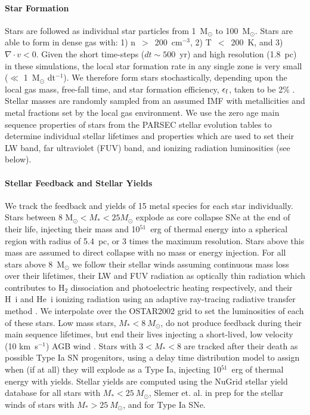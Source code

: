 \paragraph{Star Formation} Stars are followed as individual star particles from 1~M$_{\odot}$ to 100~M$_{\odot}$. Stars are able to form in dense gas with: 1) n~$>$~200~cm$^{-3}$, 2) T~$<$~200~K, and 3) $\nabla \cdot v < 0$. Given the short time-steps ($dt \sim 500$~yr) and high resolution (1.8~pc) in these simulations, the local star formation rate in any single zone is very small ($\ll$ 1~M$_{\odot}$ dt$^{-1}$). We therefore form stars stochastically, depending upon the local gas mass, free-fall time, and star formation efficiency, $\epsilon_{\rm f}$, taken to be 2\% \citep{KrumholzMcKee2005}. Stellar masses are randomly sampled from an assumed \cite{Salpeter1955} IMF with metallicities and metal fractions set by the local gas environment. We use the zero age main sequence properties of stars from the \textsc{PARSEC} stellar evolution tables \citep{Bressan2012,Tang2014} to determine individual stellar lifetimes and properties which are used to set their LW band, far ultraviolet (FUV) band, and ionizing radiation luminosities (see below).

\paragraph{Stellar Feedback and Stellar Yields} We track the feedback and yields of 15 metal species for each star individually. Stars between 8 M$_{\odot} < M_{*} < 25 M_{\odot}$ explode as core collapse SNe at the end of their life, injecting their mass and 10$^{51}$~erg of thermal energy into a spherical region with radius of 5.4~pc, or 3 times the maximum resolution. Stars above this mass are assumed to direct collapse with no mass or energy injection. For all stars above 8~M$_{\odot}$ we follow their stellar winds assuming continuous mass loss over their lifetimes, their LW and FUV radiation as optically thin radiation which contributes to H$_2$ dissociation and photoelectric heating respectively, and their H~{\sc i} and He~{\sc i} ionizing radiation using an adaptive ray-tracing radiative transfer method \citep{WiseAbel2011}. We interpolate over the OSTAR2002 \citep{Lanz2003} grid to set the luminosities of each of these stars. Low mass stars, $M_{*} < 8~M_{\odot}$, do not produce feedback during their main sequence lifetimes, but end their lives injecting a short-lived, low velocity (10 km~s$^{-1}$) AGB wind \citep{Goldman2017}. Stars with $3 < M_{*} < 8$ are tracked after their death as possible Type Ia SN progenitors, using a delay time distribution model to assign when (if at all) they will explode as a Type Ia, injecting 10$^{51}$~erg of thermal energy with yields. Stellar yields are computed using the NuGrid stellar yield database \citep{Ritter2018} for all stars with $M_{*} < 25~M_{\odot}$, Slemer et. al. in prep for the stellar winds of stars with $M_{*} > 25~M_{\odot}$, and \cite{Thielemann1986} for Type Ia SNe.

